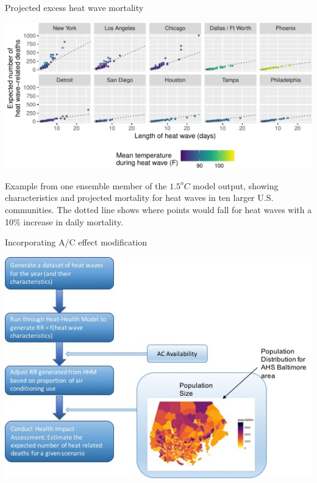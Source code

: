 \documentclass[ignorenonframetext,]{beamer}
\begin{document}
\begin{frame}{Projected excess heat wave mortality}

\includegraphics{anderson_sees_2017_files/figure-beamer/unnamed-chunk-15-1.pdf}

\vspace{-0.1in}

\footnotesize

Example from one ensemble member of the \(1.5^{o}C\) model output,
showing characteristics and projected mortality for heat waves in ten
larger U.S. communities. The dotted line shows where points would fall
for heat waves with a 10\% increase in daily mortality.

\end{frame}

\begin{frame}{Incorporating A/C effect modification}

\begin{center}\includegraphics[width=7.51in,height=0.85\textheight]{hazard_sees_overview_update} \end{center}

\end{frame}
\end{document}
